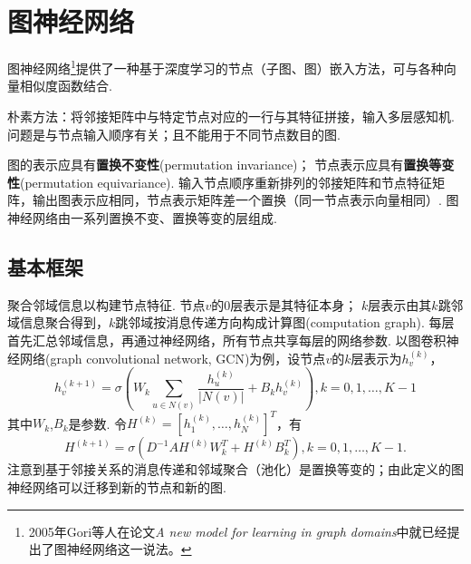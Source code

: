 \section{图神经网络}

\par 图神经网络\footnote{2005年Gori等人在论文\emph{A new model for learning in graph domains}中就已经提出了图神经网络这一说法。}提供了一种基于深度学习的节点（子图、图）嵌入方法，可与各种向量相似度函数结合. 

\par 朴素方法：将邻接矩阵中与特定节点对应的一行与其特征拼接，输入多层感知机. 问题是与节点输入顺序有关；且不能用于不同节点数目的图. 

\par 图的表示应具有\textbf{置换不变性}(permutation invariance)； 节点表示应具有\textbf{置换等变性}(permutation equivariance). 输入节点顺序重新排列的邻接矩阵和节点特征矩阵，输出图表示应相同，节点表示矩阵差一个置换（同一节点表示向量相同）. 图神经网络由一系列置换不变、置换等变的层组成. 

\subsection{基本框架}
\par 聚合邻域信息以构建节点特征. 节点$v$的0层表示是其特征本身； $k$层表示由其$k$跳邻域信息聚合得到，$k$跳邻域按消息传递方向构成计算图(computation graph). 每层首先汇总邻域信息，再通过神经网络，所有节点共享每层的网络参数. 以图卷积神经网络(graph convolutional network, GCN)为例，设节点$v$的$k$层表示为$h_v^{(k)}$，
\begin{equation}
    h_v^{(k+1)}=\sigma(W_k\sum_{u\in N(v)}\frac{h_u^{(k)}}{\vert N(v)\vert}+B_k h_v^{(k)}), k=0,1,\dots,K-1
\end{equation}
其中$W_k$,$B_k$是参数. 令$H^{(k)}=[h_1^{(k)},\dots, h_N^{(k)}]^T$，有
\begin{equation}
H^{(k+1)}=\sigma(D^{-1}AH^{(k)}W_k^T+H^{(k)}B_k^T), k=0,1,\dots,K-1.
\end{equation}
注意到基于邻接关系的消息传递和邻域聚合（池化）是置换等变的；由此定义的图神经网络可以迁移到新的节点和新的图. 

